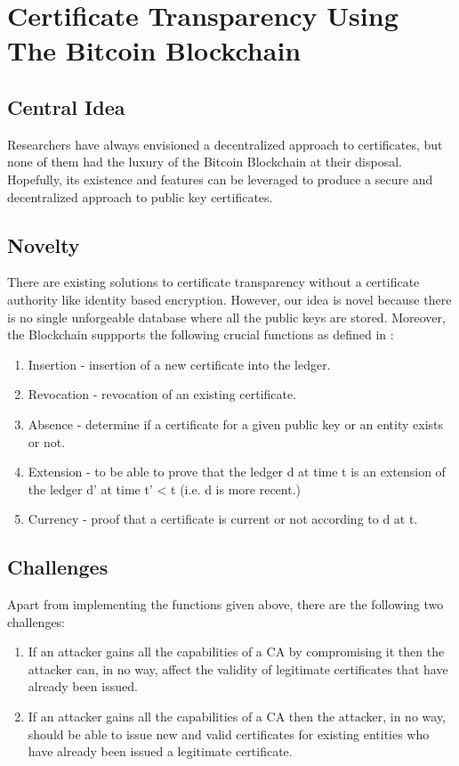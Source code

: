 \documentclass[a4paper]{article}
\begin{document}
\section{Certificate Transparency Using The Bitcoin Blockchain}
\subsection{Central Idea}
Researchers have always envisioned a decentralized approach to certificates, but none of them had the luxury of the Bitcoin Blockchain at their disposal. Hopefully, its existence and features can be leveraged to produce a secure and decentralized approach to public key certificates.

\subsection{Novelty}
There are existing solutions to certificate transparency without a certificate authority like identity based encryption. However, our idea is novel because there is no single unforgeable database where all the public keys are stored. Moreover, the Blockchain suppports the following crucial functions as defined in \cite{johnny}:
\begin{enumerate}
\item Insertion - insertion of a new certificate into the ledger.
\item Revocation - revocation of an existing certificate.
\item Absence - determine if a certificate for a given public key or an entity exists or not.
\item Extension - to be able to prove that the ledger d at time t is an extension of the ledger d’ at time t’ < t (i.e. d is more recent.)
\item Currency - proof that a certificate is current or not according to d at t.
\end{enumerate}

\subsection{Challenges}
Apart from implementing the functions given above, there are the following two challenges:
\begin{enumerate}
\item If an attacker gains all the capabilities of a CA by compromising it then the attacker can, in no way, affect the validity of legitimate certificates that have already been issued.
\item If an attacker gains all the capabilities of a CA then the attacker, in no way, should be able to issue new and valid certificates for existing entities who have already been issued a legitimate certificate.
\end{enumerate}
\end{document}
